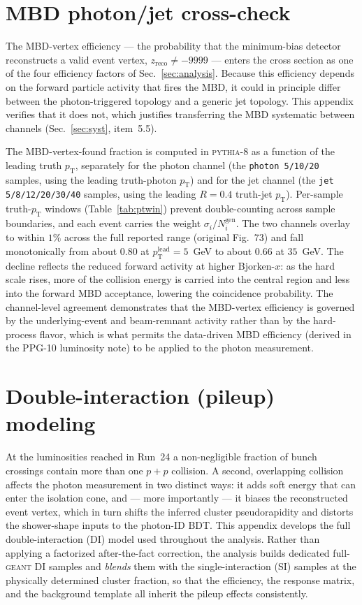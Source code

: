 \documentclass[11pt]{article}
\newcommand{\pt}{p_{\mathrm{T}}}
\begin{document}
\section{MBD photon/jet cross-check}
\label{app:mbd}
The MBD-vertex efficiency --- the probability that the minimum-bias detector
reconstructs a valid event vertex, $z_{\mathrm{reco}}\ne-9999$ --- enters the
cross section as one of the four efficiency factors of Sec.~\ref{sec:analysis}.
Because this efficiency depends on the forward particle activity that fires the
MBD, it could in principle differ between the photon-triggered topology and a
generic jet topology. This appendix verifies that it does not, which justifies
transferring the MBD systematic between channels (Sec.~\ref{sec:syst}, item~5.5).

The MBD-vertex-found fraction is computed in \textsc{pythia-8} as a function of
the leading truth $\pt$, separately for the photon channel (the
\texttt{photon\,5/10/20} samples, using the leading truth-photon $\pt$) and for
the jet channel (the \texttt{jet\,5/8/12/20/30/40} samples, using the leading
$R=0.4$ truth-jet $\pt$). Per-sample truth-$\pt$ windows
(Table~\ref{tab:ptwin}) prevent double-counting across sample boundaries, and each
event carries the weight $\sigma_i/N_i^{\mathrm{gen}}$. The two channels overlay
to within $1\%$ across the full reported range (original Fig.~73) and fall
monotonically from about $0.80$ at $p_{\mathrm{T}}^{\mathrm{lead}}=5$~GeV to about
$0.66$ at $35$~GeV. The decline reflects the reduced forward activity at higher
Bjorken-$x$: as the hard scale rises, more of the collision energy is carried into
the central region and less into the forward MBD acceptance, lowering the
coincidence probability. The channel-level agreement demonstrates that the
MBD-vertex efficiency is governed by the underlying-event and beam-remnant
activity rather than by the hard-process flavor, which is what permits the
data-driven MBD efficiency (derived in the PPG-10 luminosity note) to be applied
to the photon measurement.

\section{Double-interaction (pileup) modeling}
\label{app:di}
At the luminosities reached in Run~24 a non-negligible fraction of bunch crossings
contain more than one $p+p$ collision. A second, overlapping collision affects the
photon measurement in two distinct ways: it adds soft energy that can enter the
isolation cone, and --- more importantly --- it biases the reconstructed event
vertex, which in turn shifts the inferred cluster pseudorapidity and distorts the
shower-shape inputs to the photon-ID BDT. This appendix develops the full
double-interaction (DI) model used throughout the analysis. Rather than applying a
factorized after-the-fact correction, the analysis builds dedicated full-\textsc{geant}
DI samples and \emph{blends} them with the single-interaction (SI) samples at the
physically determined cluster fraction, so that the efficiency, the response
matrix, and the background template all inherit the pileup effects consistently.
\end{document}
